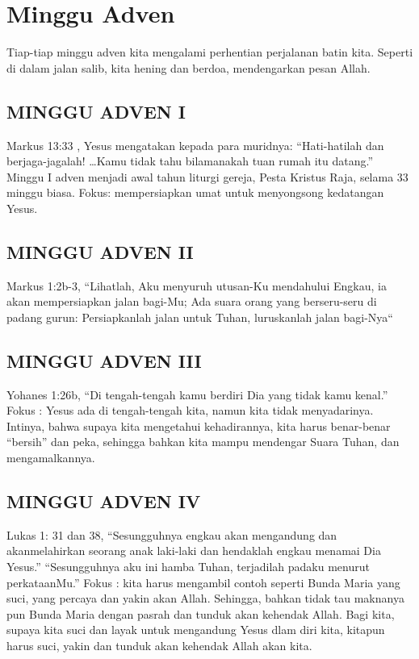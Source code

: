 \section*{Minggu Adven}
Tiap-tiap minggu adven kita mengalami perhentian perjalanan batin kita. Seperti di dalam jalan salib, kita hening dan berdoa, mendengarkan pesan Allah. 

\subsection*{MINGGU ADVEN I}
Markus 13:33 , Yesus mengatakan kepada para muridnya: ``Hati-hatilah dan berjaga-jagalah! \ldots Kamu tidak tahu bilamanakah tuan rumah itu datang.'' Minggu I adven menjadi awal tahun liturgi gereja, Pesta Kristus Raja, selama 33 minggu biasa. 
Fokus: mempersiapkan umat untuk menyongsong kedatangan Yesus. 

\subsection*{MINGGU ADVEN II}
Markus 1:2b-3, ``Lihatlah, Aku menyuruh utusan-Ku mendahului Engkau, ia akan mempersiapkan jalan bagi-Mu; Ada suara orang yang berseru-seru di padang gurun: Persiapkanlah jalan untuk Tuhan, luruskanlah jalan bagi-Nya``

\subsection*{MINGGU ADVEN III}
Yohanes 1:26b, ``Di tengah-tengah kamu berdiri Dia yang tidak kamu kenal.''  Fokus : Yesus ada di tengah-tengah kita, namun kita tidak menyadarinya. Intinya, bahwa supaya kita mengetahui kehadirannya, kita harus benar-benar ``bersih'' dan peka, sehingga bahkan kita mampu mendengar Suara Tuhan, dan mengamalkannya. 

\subsection*{MINGGU ADVEN IV}
Lukas 1: 31 dan 38, ``Sesungguhnya engkau akan mengandung dan akanmelahirkan seorang anak laki-laki dan hendaklah engkau menamai Dia Yesus.'' 
``Sesungguhnya aku ini hamba Tuhan, terjadilah padaku menurut perkataanMu.'' 
Fokus : kita harus mengambil contoh seperti Bunda Maria yang suci, yang percaya dan yakin akan Allah. Sehingga, bahkan tidak tau maknanya pun Bunda Maria dengan pasrah dan tunduk akan kehendak Allah. Bagi kita, supaya kita suci dan layak untuk mengandung Yesus dlam diri kita, kitapun harus suci, yakin dan tunduk akan kehendak Allah akan kita. 

